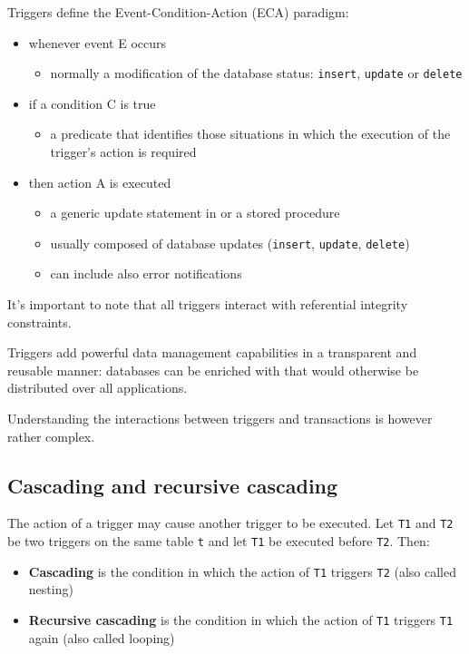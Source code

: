 \documentclass[english]{article}
\begin{document}
Triggers define the Event-Condition-Action (ECA) paradigm:

\begin{itemize}
  \item whenever event E occurs
        \begin{itemize}[label=\(\rightarrow\)]
          \item normally a modification of the database status: \texttt{insert}, \texttt{update} or \texttt{delete}
        \end{itemize}
  \item if a condition C is true
        \begin{itemize}
          \item a predicate that identifies those situations in which the execution of the trigger's action is required
        \end{itemize}
  \item then action A is executed
        \begin{itemize}[label=\(\rightarrow\)]
          \item a generic update statement in or a stored procedure
          \item usually composed of database updates (\texttt{insert}, \texttt{update}, \texttt{delete})
          \item can include also error notifications
        \end{itemize}
\end{itemize}

It's important to note that all triggers interact with referential integrity constraints.

\bigskip
Triggers add powerful data management capabilities in a transparent and reusable manner:
databases can be enriched with  that would otherwise be distributed over all applications.

Understanding the interactions between triggers and transactions is however rather complex.

\subsection{Cascading and recursive cascading}

The action of a trigger may cause another trigger to be executed.
Let \texttt{T1} and \texttt{T2} be two triggers on the same table \texttt{t} and let \texttt{T1} be executed before \texttt{T2}.
Then:

\begin{itemize}
  \item \textbf{Cascading} is the condition in which the action of \texttt{T1} triggers \texttt{T2} (also called nesting)
  \item \textbf{Recursive cascading} is the condition in which the action of \texttt{T1} triggers \texttt{T1} again (also called looping)
\end{itemize}
\end{document}
